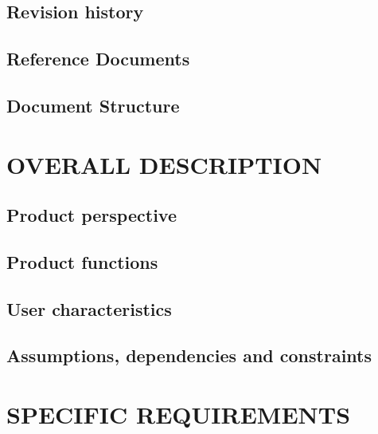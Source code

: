 \documentclass[11pt]{report}
\begin{document}
		\section{Revision history}
		\label{sect:Revision history}
			
		\section{Reference Documents}
		\label{sect:Documents}
			
			
		\section{Document Structure}
		\label{sect:Document Structure}
			
			
	\chapter{OVERALL DESCRIPTION}
	\label{ch:OVERALL DESCRIPTION}
	
		\section{Product perspective}
		\label{sect:Product perspective}
			
		\section{Product functions}
		\label{sect:Product functions}
			
			
		\section{User characteristics}
		\label{sect:User characteristics}
			
		\section{Assumptions, dependencies and constraints}
		\label{sect:Assumptions, dependencies and constraints}
			
	\chapter{SPECIFIC REQUIREMENTS}
	\label{ch:SPECIFIC REQUIREMENTS}
	
\end{document}
